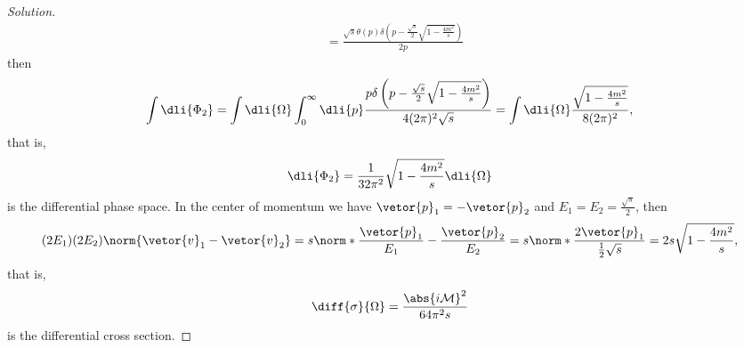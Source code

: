 \begin{proof}[Solution]
\begin{align*}
        &= \frac{\sqrt{s}\theta(p)\delta\left(p - \frac{\sqrt{s}}{2}\sqrt{1 - \frac{4m^2}{s}}\right)}{2p}
    \end{align*}
    then
    \begin{equation*}
        \int \dli{\Phi_2} = \int \dli{\Omega} \int_0^\infty \dli{p} \frac{p\delta\left(p - \frac{\sqrt{s}}{2}\sqrt{1 - \frac{4m^2}{s}}\right)}{4(2\pi)^2 \sqrt{s}} = \int \dli{\Omega} \frac{\sqrt{1 - \frac{4m^2}{s}}}{8(2\pi)^2},
    \end{equation*}
    that is,
    \begin{equation*}
        \dli{\Phi_2} = \frac{1}{32\pi^2}\sqrt{1 - \frac{4m^2}{s}}\dli{\Omega}
    \end{equation*}
    is the differential phase space. In the center of momentum we have \(\vetor{p}_1 = -\vetor{p}_2\) and \(E_1 = E_2 = \frac{\sqrt{s}}{2}\), then
    \begin{equation*}
        (2 E_1)(2E_2) \norm{\vetor{v}_1 - \vetor{v}_2} = s \norm*{\frac{\vetor{p}_1}{E_1} - \frac{\vetor{p}_2}{E_2}} = s \norm*{\frac{2\vetor{p}_1}{\frac12\sqrt{s}}} = 2s \sqrt{1 - \frac{4m^2}{s}},
    \end{equation*}
    that is,
    \begin{equation*}
        \diff{\sigma}{\Omega} = \frac{\abs{i\mathcal{M}}^2}{64 \pi^2 s}
    \end{equation*}
    is the differential cross section.


\end{proof}
